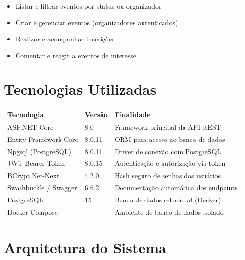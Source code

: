 \documentclass[11pt, a4paper, oneside]{article}
\begin{document}
\begin{itemize}[noitemsep]
  \item Listar e filtrar eventos por status ou organizador
  \item Criar e gerenciar eventos (organizadores autenticados)
  \item Realizar e acompanhar inscrições
  \item Comentar e reagir a eventos de interesse
\end{itemize}

\section{Tecnologias Utilizadas}

\begin{longtable}{L{4.5cm} L{4cm} L{6cm}}
\toprule
{}
\color{white}\textbf{Tecnologia} & \color{white}\textbf{Versão} & \color{white}\textbf{Finalidade} \\
\midrule
\endhead
ASP.NET Core & 8.0 & Framework principal da API REST \\
Entity Framework Core & 8.0.11 & ORM para acesso ao banco de dados \\
Npgsql (PostgreSQL) & 8.0.11 & Driver de conexão com PostgreSQL \\
JWT Bearer Token & 8.0.15 & Autenticação e autorização via token \\
BCrypt.Net-Next & 4.2.0 & Hash seguro de senhas dos usuários \\
Swashbuckle / Swagger & 6.6.2 & Documentação automática dos endpoints \\
PostgreSQL & 15 & Banco de dados relacional (Docker) \\
Docker Compose & - & Ambiente de banco de dados isolado \\
\bottomrule
\end{longtable}

\section{Arquitetura do Sistema}
\end{document}
